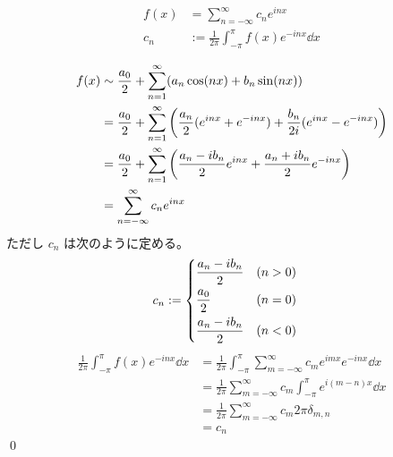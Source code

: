 \documentclass[uplatex,dvipdfmx,a4paper,11pt]{jlreq}
\makeatletter
\theoremstyle{definition}
\renewenvironment{proof}[1][\proofname]{\par
  \normalfont
  \topsep6\p@\@plus6\p@ \trivlist
  \item[\hskip\labelsep{\bfseries #1}\@addpunct{\bfseries}]\ignorespaces\quad\par
}{%
  \qed\endtrivlist\@endpefalse
}
\renewcommand\proofname{証明}
\makeatother
\begin{document}
\begin{definition}[$2\pi$ の周期をもつ関数の複素フーリエ級数]
  \begin{align}
    f(x) & = \sum_{n=-\infty}^{\infty}c_ne^{inx}               \\
    c_n  & := \frac{1}{2\pi}\int_{-\pi}^\pi f(x)e^{-inx}\dd{x}
  \end{align}
\end{definition}
\begin{proof}
  \begin{align}
    f(x) & \sim \frac{a_0}{2} + \sum_{n=1}^{\infty}(a_n\cos(nx) + b_n\sin(nx))                                               \\
         & = \frac{a_0}{2} + \sum_{n=1}^{\infty}\qty(\frac{a_n}{2}(e^{inx} + e^{-inx}) + \frac{b_n}{2i}(e^{inx} - e^{-inx})) \\
         & = \frac{a_0}{2} + \sum_{n=1}^{\infty}\qty(\frac{a_n - ib_n}{2}e^{inx} + \frac{a_n + ib_n}{2}e^{-inx})             \\
         & = \sum_{n=-\infty}^{\infty}c_ne^{inx}
  \end{align}
  ただし $c_n$ は次のように定める。
  \begin{align}
    c_n & := \begin{dcases}
               \frac{a_n - ib_n}{2} & (n > 0) \\
               \frac{a_0}{2}        & (n = 0) \\
               \frac{a_n - ib_n}{2} & (n < 0)
             \end{dcases}
  \end{align}
  \begin{align}
    \frac{1}{2\pi}\int_{-\pi}^\pi f(x)e^{-inx}\dd{x} & = \frac{1}{2\pi}\int_{-\pi}^\pi\sum_{m=-\infty}^{\infty}c_me^{imx}e^{-inx}\dd{x} \\
                                                     & = \frac{1}{2\pi}\sum_{m=-\infty}^{\infty}c_m\int_{-\pi}^\pi e^{i(m - n)x}\dd{x}  \\
                                                     & = \frac{1}{2\pi}\sum_{m=-\infty}^{\infty}c_m 2\pi\delta_{m,n}                    \\
                                                     & = c_n
  \end{align}
\end{proof}
\end{document}
